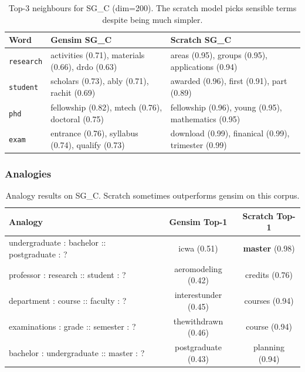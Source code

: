 \documentclass[11pt,a4paper]{article}
\begin{document}
\begin{table}[H]
\centering
\caption{Top-3 neighbours for SG\_C (dim=200). The scratch model picks sensible terms despite being much simpler.}
\renewcommand{\arraystretch}{1.35}
\small
{}
\begin{tabularx}{\textwidth}{lXX}
\toprule
\textbf{Word} & \textbf{Gensim SG\_C} & \textbf{Scratch SG\_C} \\
\midrule
\texttt{research}
  & activities (0.71), materials (0.66), drdo (0.63)
  & areas (0.95), groups (0.95), applications (0.94) \\
\addlinespace
\texttt{student}
  & scholars (0.73), ably (0.71), rachit (0.69)
  & awarded (0.96), first (0.91), part (0.89) \\
\addlinespace
\texttt{phd}
  & fellowship (0.82), mtech (0.76), doctoral (0.75)
  & fellowship (0.96), young (0.95), mathematics (0.95) \\
\addlinespace
\texttt{exam}
  & entrance (0.76), syllabus (0.74), qualify (0.73)
  & download (0.99), finanical (0.99), trimester (0.99) \\
\bottomrule
\end{tabularx}
\label{tab:nn_compare}
\end{table}

\subsubsection*{Analogies}

\begin{table}[H]
\centering
\caption{Analogy results on SG\_C. Scratch sometimes outperforms gensim on this corpus.}
\renewcommand{\arraystretch}{1.35}
\small
{}
\begin{tabularx}{\textwidth}{lcc}
\toprule
\textbf{Analogy} & \textbf{Gensim Top-1} & \textbf{Scratch Top-1} \\
\midrule
undergraduate : bachelor :: postgraduate : ? & icwa (0.51) & \textbf{master} (0.98) \\
professor : research :: student : ?          & aeromodeling (0.42) & credits (0.76) \\
department : course :: faculty : ?           & interestunder (0.45) & courses (0.94) \\
examinations : grade :: semester : ?         & thewithdrawn (0.46) & course (0.94) \\
bachelor : undergraduate :: master : ?       & postgraduate (0.43) & planning (0.94) \\
\bottomrule
\end{tabularx}
\label{tab:analogy_compare}
\end{table}
\end{document}
